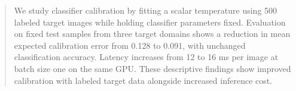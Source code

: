 \begin{abstract}
We study classifier calibration by fitting a scalar temperature using 500 labeled target images while holding classifier parameters fixed. Evaluation on fixed test samples from three target domains shows a reduction in mean expected calibration error from 0.128 to 0.091, with unchanged classification accuracy. Latency increases from 12 to 16 ms per image at batch size one on the same GPU. These descriptive findings show improved calibration with labeled target data alongside increased inference cost.
\end{abstract}
